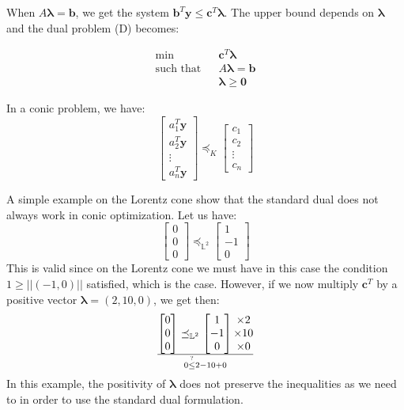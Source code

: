 When $A\boldsymbol{\lambda}=\boldsymbol{b}$, we get the system $\boldsymbol{b}^T \boldsymbol{y} \leq \boldsymbol{c}^T \boldsymbol{\lambda}$. The upper bound depends on $\boldsymbol{\lambda}$ and the dual problem (D) becomes:

\begin{eqnarray*}
\min & & \boldsymbol{c}^T \boldsymbol{\lambda}\\
\text{such that}& & A\boldsymbol{\lambda}=\boldsymbol{b}\\
             & &\boldsymbol{\lambda} \geq \boldsymbol{0}
\end{eqnarray*}

In a conic problem, we have:
\[\begin{bmatrix}
 a_1^T \boldsymbol{y}\\
 a_2^T \boldsymbol{y}\\
 \vdots\\
 a_n^T \boldsymbol{y}
\end{bmatrix} \preceq_K \begin{bmatrix}
 c_1\\
 c_2\\
 \vdots\\
 c_n
\end{bmatrix}\]

A simple example on the Lorentz cone show that the standard dual does not always work in conic optimization. Let us have:
\[\begin{bmatrix}
 0\\
 0\\
 0
\end{bmatrix} \preceq_{\mathbb{L}^2} \begin{bmatrix}
 1\\
 -1\\
 0
\end{bmatrix}\]
This is valid since on the Lorentz cone we must have in this case the condition $1\geq ||(-1,0)||$ satisfied, which is the case. However, if we now multiply $\boldsymbol{c}^T$ by a positive vector $\boldsymbol{\lambda}=(2,10,0)$, we get then:
\[\begin{bmatrix}
 0\\
 0\\
 0
\end{bmatrix} \preceq_{\mathbb{L}^2} \begin{bmatrix}
 1\\
 -1\\
 0
\end{bmatrix}\begin{matrix}
 \times 2\\
 \times 10\\
 \times 0
\end{matrix}\over
0 \stackrel{?}{\leq} 2-10+0\]
In this example, the positivity of $\boldsymbol{\lambda}$ does not preserve the inequalities as we need to in order to use the standard dual formulation.\\

